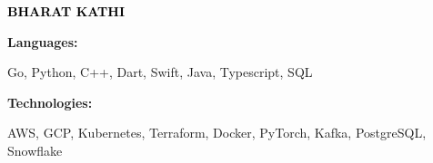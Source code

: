 \documentclass[9pt]{developercv} %
\begin{document}

\begin{minipage}[t]{0.5\textwidth} 
	\vspace{-\baselineskip} %
	
	{ \fontsize{16}{20} \textcolor{black}{\textbf{\MakeUppercase{Bharat Kathi}}}} %
	
	\vspace{6pt}
    \hspace{8pt}

    \hspace{24pt}
    
\end{minipage}
\hfill
\begin{minipage}[t]{0.5\textwidth}
    \vspace{-18pt}
    \vspace{-6pt}
    
    \begin{minipage}[t]{0.2\textwidth}
        \textbf{Languages:}
    \end{minipage}
    \hfill
    \begin{minipage}[t]{0.73\textwidth}
       Go, Python, C++, Dart, Swift, Java, Typescript, SQL
    \end{minipage}
    \vspace{5 pt}
    
    \begin{minipage}[t]{0.2\textwidth}
        \textbf{Technologies:}
    \end{minipage}
    \hfill
    \begin{minipage}[t]{0.73\textwidth}
        AWS, GCP, Kubernetes, Terraform, Docker, PyTorch, Kafka, PostgreSQL, Snowflake
    \end{minipage}
    
\end{minipage}
\end{document}
